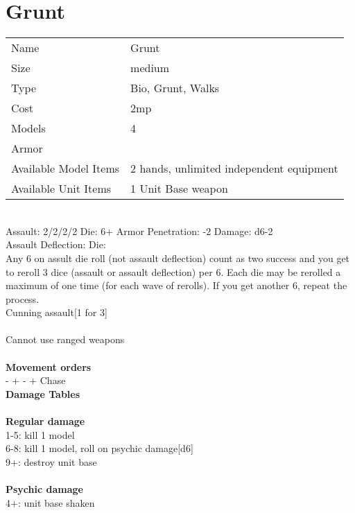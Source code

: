 \pagebreak

\section{ Grunt }

\begin{tabular}{ll}
  Name & Grunt \\
  Size & medium\\
  Type & Bio, Grunt, Walks\\
  Cost & 2mp\\
  Models & 4\\
  Armor & \\
  Available Model Items & 2 hands, unlimited independent equipment \\
  Available Unit Items & 1 Unit Base weapon \\
\end{tabular}

\ \\
Assault: 2/2/2/2 Die: 6+ Armor Penetration: -2 Damage: d6-2 \\
Assault Deflection:  Die: \\
\indent Any 6 on assult die roll (not assault deflection) count as two success and you get to reroll 3 dice (assault or assault deflection) per 6. Each die may be rerolled a maximum of one time (for each wave of rerolls). If you get another 6, repeat the process. \\ Cunning assault[1 for 3] \\
\ \\
Cannot use ranged weapons
\ \\


\ \\ {\bf Movement orders } \\
- + - + Chase \\



{\bf Damage Tables} \\
\ \\ {\bf Regular damage } \\
1-5: kill 1 model \\
6-8: kill 1 model, roll on psychic damage[d6] \\
9+: destroy unit base \\
\ \\ {\bf Psychic damage } \\
4+: unit base shaken \\










